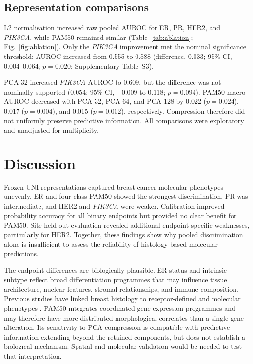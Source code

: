 \documentclass[pdflatex]{cas-dc}
\theoremstyle{remark}
\theoremstyle{plain}
\begin{document}
\subsection{Representation comparisons}

L2 normalisation increased raw pooled AUROC for ER, PR, HER2, and \textit{PIK3CA}, while PAM50 remained similar (Table~\ref{tab:ablation}; Fig.~\ref{fig:ablation}). Only the \textit{PIK3CA} improvement met the nominal significance threshold: AUROC increased from 0.555 to 0.588 (difference, 0.033; 95\% CI, 0.004--0.064; $p=0.020$; Supplementary Table~S3).

PCA-32 increased \textit{PIK3CA} AUROC to 0.609, but the difference was not nominally supported (0.054; 95\% CI, $-0.009$ to 0.118; $p=0.094$). PAM50 macro-AUROC decreased with PCA-32, PCA-64, and PCA-128 by 0.022 ($p=0.024$), 0.017 ($p=0.004$), and 0.015 ($p=0.002$), respectively. Compression therefore did not uniformly preserve predictive information. All comparisons were exploratory and unadjusted for multiplicity.




\section{Discussion}

Frozen UNI representations captured breast-cancer molecular phenotypes unevenly. ER and four-class PAM50 showed the strongest discrimination, PR was intermediate, and HER2 and \textit{PIK3CA} were weaker. Calibration improved probability accuracy for all binary endpoints but provided no clear benefit for PAM50. Site-held-out evaluation revealed additional endpoint-specific weaknesses, particularly for HER2. Together, these findings show why pooled discrimination alone is insufficient to assess the reliability of histology-based molecular predictions.

The endpoint differences are biologically plausible. ER status and intrinsic subtype reflect broad differentiation programmes that may influence tissue architecture, nuclear features, stromal relationships, and immune composition. Previous studies have linked breast histology to receptor-defined and molecular phenotypes \citep{Couture2018,Rawat2020,Ektefaie2021,Shamai2024}. PAM50 integrates coordinated gene-expression programmes and may therefore have more distributed morphological correlates than a single-gene alteration. Its sensitivity to PCA compression is compatible with predictive information extending beyond the retained components, but does not establish a biological mechanism. Spatial and molecular validation would be needed to test that interpretation.
\end{document}
